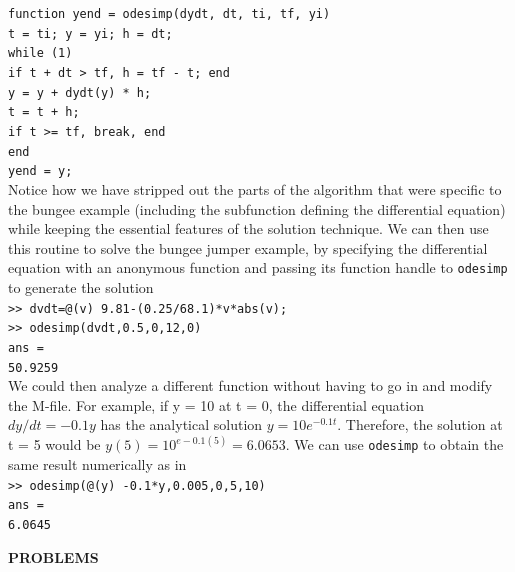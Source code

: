 \documentclass[../main.tex]{subfiles}
\begin{document}
\texttt{function yend = odesimp(dydt, dt, ti, tf, yi)\\
\indent t = ti; y = yi; h = dt;\\
\indent while (1)\\
\indent \hspace{2mm}if t + dt > tf, h = tf - t; end\\
\indent \hspace{2mm}y = y + dydt(y) * h;\\
\indent \hspace{2mm}t = t + h;\\
\indent \hspace{2mm}if t >= tf, break, end\\
\indent end\\
\indent yend = y;}\\

Notice how we have stripped out the parts of the algorithm that were specific to
the bungee example (including the subfunction defining the differential equation)
while keeping the essential features of the solution technique. We can then use this
routine to solve the bungee jumper example, by specifying the differential equation
with an anonymous function and passing its function handle to \texttt{odesimp} to generate
the solution\\

\texttt{>> dvdt=@(v) 9.81-(0.25/68.1)*v*abs(v);\\
\indent >> odesimp(dvdt,0.5,0,12,0)\\
\indent ans =\\
\indent\hspace{2mm}50.9259}\\

We could then analyze a different function without having to go in and modify the
M-file. For example, if y = 10 at t = 0, the differential equation $dy/dt=-0.1y$ has the analytical
solution $y = 10e^{-0.1t}$. Therefore, the solution at t = 5 would be $y(5) = 10^{e-0.1(5)} = 6.0653$.
We can use \texttt{odesimp} to obtain the same result numerically as in\\

\texttt{>> odesimp(@(y) -0.1*y,0.005,0,5,10)\\
\indent ans =\\
\indent\hspace{2mm} 6.0645}\\
\bigskip

\noindent\textbf{PROBLEMS}\\
\end{document}
